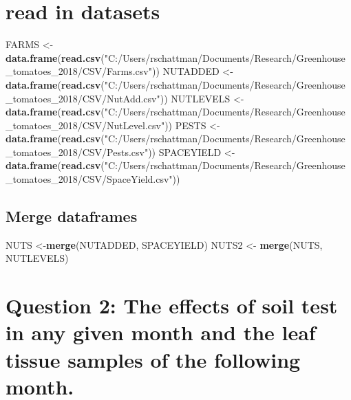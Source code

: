 \documentclass[]{article}
\newenvironment{Shaded}{\begin{snugshade}}{\end{snugshade}}
\newcommand{\KeywordTok}[1]{\textcolor[rgb]{0.13,0.29,0.53}{\textbf{{#1}}}}
\newcommand{\StringTok}[1]{\textcolor[rgb]{0.31,0.60,0.02}{{#1}}}
\newcommand{\NormalTok}[1]{{#1}}
\begin{document}
\section{read in datasets}\label{read-in-datasets}

\begin{Shaded}
\begin{Highlighting}[]
\NormalTok{FARMS <-}\StringTok{ }\KeywordTok{data.frame}\NormalTok{(}\KeywordTok{read.csv}\NormalTok{(}\StringTok{"C:/Users/rschattman/Documents/Research/Greenhouse_tomatoes_2018/CSV/Farms.csv"}\NormalTok{))}
\NormalTok{NUTADDED <-}\StringTok{ }\KeywordTok{data.frame}\NormalTok{(}\KeywordTok{read.csv}\NormalTok{(}\StringTok{"C:/Users/rschattman/Documents/Research/Greenhouse_tomatoes_2018/CSV/NutAdd.csv"}\NormalTok{))}
\NormalTok{NUTLEVELS <-}\StringTok{ }\KeywordTok{data.frame}\NormalTok{(}\KeywordTok{read.csv}\NormalTok{(}\StringTok{"C:/Users/rschattman/Documents/Research/Greenhouse_tomatoes_2018/CSV/NutLevel.csv"}\NormalTok{))}
\NormalTok{PESTS <-}\StringTok{ }\KeywordTok{data.frame}\NormalTok{(}\KeywordTok{read.csv}\NormalTok{(}\StringTok{"C:/Users/rschattman/Documents/Research/Greenhouse_tomatoes_2018/CSV/Pests.csv"}\NormalTok{))}
\NormalTok{SPACEYIELD <-}\StringTok{ }\KeywordTok{data.frame}\NormalTok{(}\KeywordTok{read.csv}\NormalTok{(}\StringTok{"C:/Users/rschattman/Documents/Research/Greenhouse_tomatoes_2018/CSV/SpaceYield.csv"}\NormalTok{))}
\end{Highlighting}
\end{Shaded}

\subsection{Merge dataframes}\label{merge-dataframes}

\begin{Shaded}
\begin{Highlighting}[]
\NormalTok{NUTS <-}\KeywordTok{merge}\NormalTok{(NUTADDED, SPACEYIELD)}
\NormalTok{NUTS2 <-}\StringTok{ }\KeywordTok{merge}\NormalTok{(NUTS, NUTLEVELS)}
\end{Highlighting}
\end{Shaded}

\section{Question 2: The effects of soil test in any given month and the
leaf tissue samples of the following
month.}\label{question-2-the-effects-of-soil-test-in-any-given-month-and-the-leaf-tissue-samples-of-the-following-month.}
\end{document}
